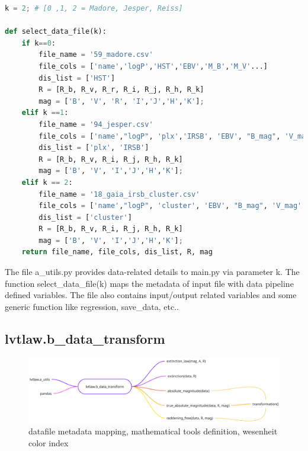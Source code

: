 \documentclass{article}
\begin{document}
\begin{lstlisting}[language=Python, caption=edit this function as per input dataset]
k = 2; # [0 ,1, 2 = Madore, Jesper, Reiss]

def select_data_file(k):
    if k==0:
        file_name = '59_madore.csv'
        file_cols = ['name','logP','HST','EBV','M_B','M_V'...] 
        dis_list = ['HST']
        R = [R_b, R_v, R_r, R_i, R_j, R_h, R_k]
        mag = ['B', 'V', 'R', 'I','J','H','K'];
    elif k ==1:
        file_name = '94_jesper.csv'
        file_cols = ['name',"logP", 'plx','IRSB', 'EBV', "B_mag", 'V_mag',...]
        dis_list = ['plx', 'IRSB']
        R = [R_b, R_v, R_i, R_j, R_h, R_k]
        mag = ['B', 'V', 'I','J','H','K'];
    elif k == 2:
        file_name = '18_gaia_irsb_cluster.csv'
        file_cols = ['name',"logP", 'cluster', 'EBV', "B_mag", 'V_mag'...]
        dis_list = ['cluster']
        R = [R_b, R_v, R_i, R_j, R_h, R_k]
        mag = ['B', 'V', 'I','J','H','K'];
    return file_name, file_cols, dis_list, R, mag

\end{lstlisting}

The file a\_utils.py provides data-related details to main.py via parameter k. The function select\_data\_file(k) maps the metadata of input file with data pipeline defined variables. The file also contains input/output related variables and some generic function like regression, save\_data, etc..


\newpage
\subsection{lvtlaw.b\_data\_transform}

\begin{figure}[h!]
\caption{\small datafile metadata mapping, mathematical tools definition, wesenheit color index}
\includegraphics[width=\textwidth]{./figures/b_data_transform.png}
\end{figure}
\end{document}
